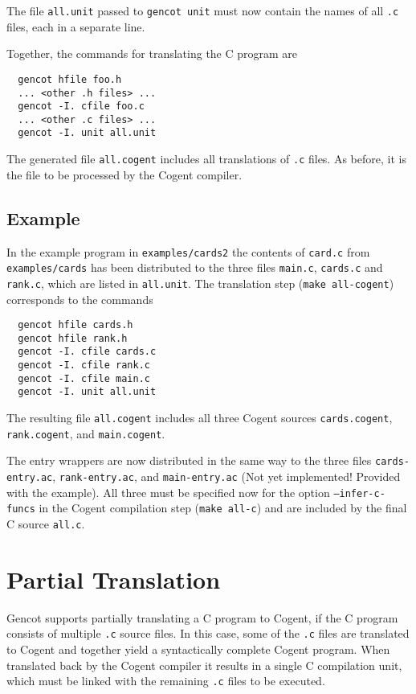 \documentclass[a4paper]{report}
\newcommand{\code}[1]{\textnormal{\texttt{#1}}}
\begin{document}
The file \code{all.unit} passed to \code{gencot unit} must now contain the names of all \code{.c} files, each in a 
separate line.

Together, the commands for translating the C program are
\begin{verbatim}
  gencot hfile foo.h
  ... <other .h files> ...
  gencot -I. cfile foo.c
  ... <other .c files> ...
  gencot -I. unit all.unit
\end{verbatim}
The generated file \code{all.cogent} includes all translations of \code{.c} files. As before, it is the 
file to be processed by the Cogent compiler.

\subsection{Example}

In the example program in \code{examples/cards2} the contents of \code{card.c} from \code{examples/cards} has been 
distributed to the three files \code{main.c}, \code{cards.c} and \code{rank.c}, which are listed in \code{all.unit}.
The translation step (\code{make all-cogent}) corresponds to the commands
\begin{verbatim}
  gencot hfile cards.h
  gencot hfile rank.h
  gencot -I. cfile cards.c
  gencot -I. cfile rank.c
  gencot -I. cfile main.c
  gencot -I. unit all.unit
\end{verbatim}
The resulting file \code{all.cogent} includes all three Cogent sources \code{cards.cogent}, \code{rank.cogent}, and
\code{main.cogent}.

The entry wrappers are now distributed in the same way to the three files \code{cards-entry.ac}, \code{rank-entry.ac},
and \code{main-entry.ac} (Not yet implemented! Provided with the example). All three must be specified now for the option
\code{--infer-c-funcs} in the Cogent compilation step (\code{make all-c}) and are included by the final C source
\code{all.c}.

\section{Partial Translation}
\label{struct-partial}

Gencot supports partially translating a C program to Cogent, if the C program consists of multiple \code{.c} source
files. In this case, some of the \code{.c} files are translated to Cogent and together yield a syntactically complete 
Cogent program. When translated back by the Cogent compiler it results in a single C compilation unit, which must be
linked with the remaining \code{.c} files to be executed.
\end{document}
